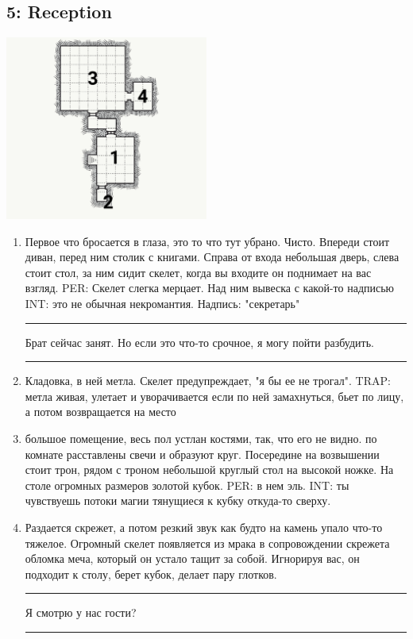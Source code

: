 \documentclass[a5paper,11pt]{book}
\newenvironment{boxed}
{\em\noindent\rule[1ex]{\linewidth}{0.1pt}\linebreak\indent}
{\par\noindent\rule[1ex]{\linewidth}{0.1pt}}
\begin{document}
\begin{multicols}{2}
\subsection{5: Reception}
\includegraphics[width=0.5\textwidth]{5}

\begin{enumerate}
\item Первое что бросается в глаза, это то что тут убрано. Чисто. Впереди стоит диван, перед ним столик с книгами. Справа от входа небольшая дверь, слева стоит стол, за ним сидит скелет, когда вы входите он поднимает на вас взгляд. PER: Скелет слегка мерцает. Над ним вывеска с какой-то надписью INT: это не обычная некромантия. Надпись: "секретарь"

\begin{boxed}
Брат сейчас занят. Но если это что-то срочное, я могу пойти разбудить.
\end{boxed}

\item Кладовка, в ней метла. Скелет предупреждает, "я бы ее не трогал". TRAP: метла живая, улетает и уворачивается если по ней замахнуться, бьет по лицу, а потом возвращается на место
\item большое помещение, весь пол устлан костями, так, что его не видно. по комнате расставлены свечи и образуют круг. Посередине на возвышении стоит трон, рядом с троном небольшой круглый стол на высокой ножке. На столе огромных размеров золотой кубок. PER: в нем эль. INT: ты чувствуешь потоки магии тянущиеся к кубку откуда-то сверху.
\item Раздается скрежет, а потом резкий звук как будто на камень упало что-то тяжелое. Огромный скелет появляется из мрака в сопровождении скрежета обломка меча, который он устало тащит за собой. Игнорируя вас, он подходит к столу, берет кубок, делает пару глотков. 

\begin{boxed}
Я смотрю у нас гости?


\end{boxed}
\end{enumerate}
\end{multicols}
\end{document}
